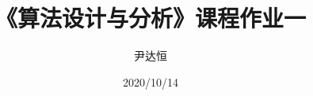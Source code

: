 \documentclass[a4paper]{ctexart}
\title{《算法设计与分析》课程作业一}
\author{尹达恒}
\date{2020/10/14}
\begin{document}
\begin{titlepage}
\maketitle
\end{titlepage}










\end{document}
